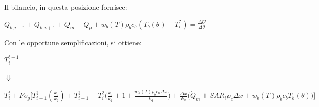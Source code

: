 Il bilancio, in questa posizione fornisce:
\begin{center}
	$ \Dot{Q} _{k, i-1} +\Dot{Q} _{k, i+1}+ \Dot{Q} _{m} +\Dot{Q} _{p}+ w_b (T) \rho _b c_b (T_b(\theta)-T_i ^?)= \frac{\Delta U}{\Delta \theta} $
\end{center}
Con le opportune semplificazioni, si ottiene:
\begin{center}
	$T_i ^{t+1} $
\end{center}
\begin{center}
	$\Downarrow$
\end{center}
\begin{center}
	$T_i ^t + Fo_{g} \Bigg[ T_{i-1} ^? (\frac{k_{c}}{k_g}) + T_{i+1} ^?- T_i ^? \Big(\frac{k_{c}}{k_g} + 1 + \frac{ w_b (T) \rho _b c_b \Delta x }{k_{g}} \Big) + \frac{\Delta x }{k_{g}} \Big(\Dot{Q} _{m} +  SAR_i \rho _{c} \Delta x + w_b (T) \rho _b c_b T_b(\theta)\Big) \Bigg]$
\end{center}

